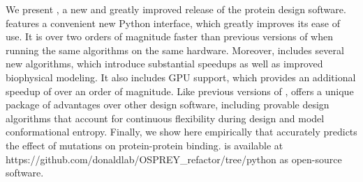 We present , a new and greatly improved release of the \osprey protein design software.   features a convenient new Python interface, which greatly improves its ease of use.  It is over two orders of magnitude faster than previous versions of \osprey when running the same algorithms on the same hardware.  Moreover,  includes several new algorithms, which introduce substantial speedups as well as improved biophysical modeling.  It also includes GPU support, which provides an additional speedup of over an order of magnitude.  Like previous versions of \osprey,  offers a unique package of advantages over other design software, including provable design algorithms that account for continuous flexibility during design and model conformational entropy.  Finally, we show here empirically that  accurately predicts the effect of mutations on protein-protein binding.  is available at https://github.com/donaldlab/OSPREY\_refactor/tree/python as open-source software.    